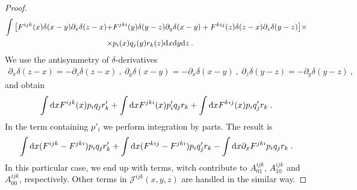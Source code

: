 \begin{proof}
    \begin{align*}
        \int \big[ F^{ijk}(x) \delta(x-y) \partial_x \delta(z-x) 
        +& F^{jki}(y) \delta(y-z) \partial_y \delta(x-y) 
        + F^{kij}(z) \delta(z-x) \partial_z \delta(y-z) \big] \times \\ 
        \times&  p_i(x) q_j(y) r_k(z) \mathrm{d} x \mathrm{d} y \mathrm{d} z \:.
    \end{align*}
    We use the antisymmetry of $\delta$-derivatives
    \begin{align*}
        \partial_x \delta(z-x) = - \partial_z \delta (z-x) \:, \:
        \partial_y \delta(x-y) = - \partial_x \delta(x-y) \:, \: 
        \partial_z \delta(y-z) = - \partial_y \delta (y-z) \:,
    \end{align*}
    and obtain
    \begin{align*}
        \int \mathrm{d} x F^{ijk}(x) p_i q_j r'_k + \int \mathrm{d} x F^{jki}(x)  p'_i q_j r_k +
        \int \mathrm{d} x F^{kij}(x) p_i q'_j r_k \:.
    \end{align*}
    In the term containing $p'_i$ we perform integration by parts. The result is
    \begin{align*}
        \int \mathrm{d} x (F^{ijk}-F^{jki}) p_i q_j  r'_k +
        \int \mathrm{d} x (F^{kij}-F^{jki}) p_i q'_j r_k -
        \int \mathrm{d} x \partial_x F^{jki} p_i q_j r_k \:.
    \end{align*}
    In this particular case, we end up with terms, witch contribute to $A^{ijk}_{01}$, $A^{ijk}_{10}$ and $A^{ijk}_{00}$, respectively. Other terms in $\mathcal J^{ijk}(x,y,z)$ are handled in the similar way.


\end{proof}
